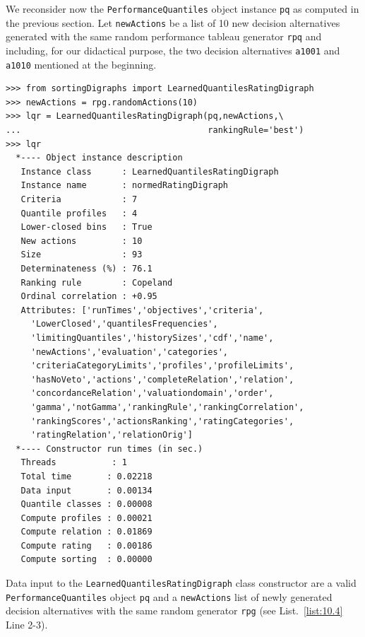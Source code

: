 We reconsider now the \texttt{PerformanceQuantiles} object instance \texttt{pq} as computed in the previous section. Let \texttt{newActions} be a list of 10 new decision alternatives generated with the same random performance tableau generator \texttt{rpq} and including, for our didactical purpose, the two decision alternatives \texttt{a1001} and \texttt{a1010} mentioned at the beginning.
\begin{lstlisting}[caption={Computing the absolute rating of 10 new decision alternatives},label=list:10.4]
>>> from sortingDigraphs import LearnedQuantilesRatingDigraph
>>> newActions = rpg.randomActions(10)
>>> lqr = LearnedQuantilesRatingDigraph(pq,newActions,\
...                                     rankingRule='best')
>>> lqr
  *---- Object instance description
   Instance class      : LearnedQuantilesRatingDigraph
   Instance name       : normedRatingDigraph
   Criteria            : 7
   Quantile profiles   : 4
   Lower-closed bins   : True
   New actions         : 10
   Size                : 93
   Determinateness (%) : 76.1
   Ranking rule        : Copeland
   Ordinal correlation : +0.95
   Attributes: ['runTimes','objectives','criteria',
     'LowerClosed','quantilesFrequencies',
     'limitingQuantiles','historySizes','cdf','name',
     'newActions','evaluation','categories',
     'criteriaCategoryLimits','profiles','profileLimits',
     'hasNoVeto','actions','completeRelation','relation',
     'concordanceRelation','valuationdomain','order',
     'gamma','notGamma','rankingRule','rankingCorrelation',
     'rankingScores','actionsRanking','ratingCategories',
     'ratingRelation','relationOrig']
  *---- Constructor run times (in sec.)
   Threads           : 1
   Total time       : 0.02218
   Data input       : 0.00134
   Quantile classes : 0.00008
   Compute profiles : 0.00021
   Compute relation : 0.01869
   Compute rating   : 0.00186
   Compute sorting  : 0.00000
\end{lstlisting}

Data input to the \texttt{LearnedQuantilesRatingDigraph} class constructor are a valid \texttt{PerformanceQuantiles} object \texttt{pq} and a \texttt{newActions} list of newly generated decision alternatives with the same random generator \texttt{rpg} (see List.~\vref{list:10.4} Line 2-3).

